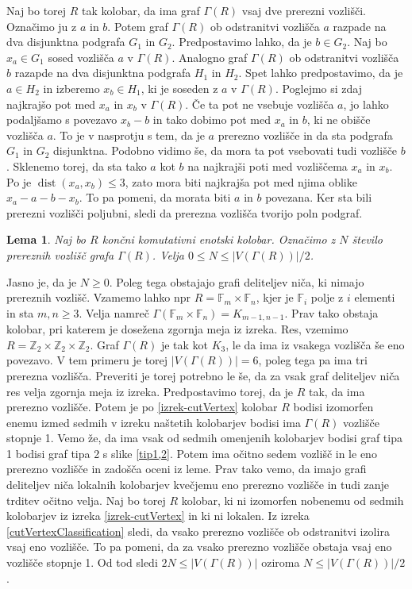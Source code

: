 \documentclass[a4paper, 12pt]{amsart}
\theoremstyle{definition} %
\theoremstyle{plain} %
\newtheorem{lema}[definicija]{Lema}
\newcommand{\Z}{\mathbb Z}
\newcommand{\F}{\mathbb F}
\DeclareMathOperator{\dist}{dist}
\begin{document}
Naj bo torej $R$ tak kolobar, da ima graf $\Gamma(R)$ vsaj dve prerezni vozlišči. Označimo ju z $a$ in $b$. Potem graf $\Gamma(R)$ ob odstranitvi vozlišča $a$ razpade na dva disjunktna podgrafa $G_1$ in $G_2$. Predpostavimo lahko, da je $b\in G_2$. Naj bo $x_a\in G_1$ sosed vozlišča $a$ v $\Gamma(R)$. Analogno graf $\Gamma(R)$ ob odstranitvi vozlišča $b$ razapde na dva disjunktna podgrafa $H_1$ in $H_2$. Spet lahko predpostavimo, da je $a\in H_2$ in izberemo $x_b\in H_1$, ki je soseden z $a$ v $\Gamma(R)$. Poglejmo si zdaj najkrajšo pot med $x_a$ in $x_b$ v $\Gamma(R)$. Če ta pot ne vsebuje vozlišča $a$, jo lahko podaljšamo s povezavo $x_b-b$ in tako dobimo pot med $x_a$ in $b$, ki ne obišče vozlišča $a$. To je v nasprotju s tem, da je $a$ prerezno vozlišče in da sta podgrafa $G_1$ in $G_2$ disjunktna. Podobno vidimo  še, da mora ta pot vsebovati tudi vozlišče $b$. Sklenemo torej, da sta tako $a$ kot $b$ na najkrajši poti med vozliščema $x_a$ in $x_b$. Po \cite{diploma} je $\dist(x_a,x_b)\le 3$, zato mora biti najkrajša pot med njima oblike $x_a  -  a - b - x_b$. To pa pomeni, da morata biti $a$ in $b$ povezana. Ker sta bili prerezni vozlišči poljubni, sledi da prerezna vozlišča tvorijo poln podgraf.
\endproof

\begin{lema}
Naj bo $R$ končni komutativni enotski kolobar. Označimo z $N$ število prereznih vozlišč grafa $\Gamma(R)$. Velja $0\le N \le |V(\Gamma(R))|/2$.
\end{lema}

\proof
Jasno je, da je $N\ge 0$. Poleg tega obstajajo grafi deliteljev niča, ki nimajo prereznih vozlišč. Vzamemo lahko npr $R=\F_m \times \F_n$, kjer je $\F_i$ polje z $i$ elementi in sta $m,n \ge 3$. Velja namreč $\Gamma(\F_m \times \F_n) = K_{m-1,n-1}$. Prav tako obstaja kolobar, pri katerem je dosežena zgornja meja iz izreka. Res, vzemimo $R=\Z_2 \times \Z_2 \times \Z_2$. Graf $\Gamma(R)$ je tak kot $K_3$, le da ima iz vsakega vozlišča še eno povezavo. V tem primeru je torej $|V(\Gamma(R))| = 6$, poleg tega pa ima tri prerezna vozlišča. Preveriti je torej potrebno le še, da za vsak graf deliteljev niča res velja zgornja meja iz izreka. Predpostavimo torej, da je $R$ tak, da ima prerezno vozlišče. Potem je po \ref{izrek-cutVertex} kolobar $R$ bodisi izomorfen enemu izmed sedmih v izreku naštetih kolobarjev bodisi ima $\Gamma(R)$ vozlišče stopnje 1. Vemo že, da ima vsak od sedmih omenjenih kolobarjev bodisi graf tipa 1 bodisi graf tipa 2 s slike \ref{tip1,2}. Potem ima očitno sedem vozlišč in le eno prerezno vozlišče in zadošča oceni iz leme. Prav tako vemo, da imajo grafi deliteljev niča lokalnih kolobarjev kvečjemu eno prerezno vozlišče in tudi zanje trditev očitno velja. Naj bo torej $R$ kolobar, ki ni izomorfen nobenemu od sedmih kolobarjev iz izreka \ref{izrek-cutVertex} in ki ni lokalen. Iz izreka \ref{cutVertexClassification} sledi, da vsako prerezno vozlišče ob odstranitvi izolira vsaj eno vozlišče. To pa pomeni, da za vsako prerezno vozlišče obstaja vsaj eno vozlišče stopnje 1. Od tod sledi $2N \le |V(\Gamma(R)) |$ oziroma $N \le |V(\Gamma(R))| /2$.
\endproof
\end{document}

